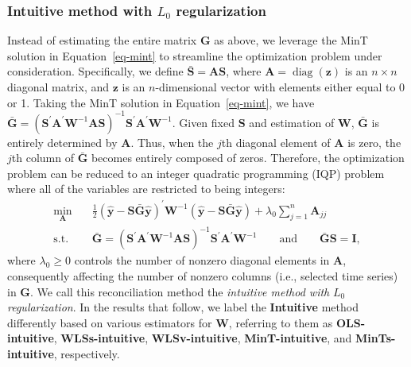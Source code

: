\documentclass[
  11pt]{article}
\begin{document}
\hypertarget{intuitive-method-with-l_0-regularization}{%
\subsubsection*{\texorpdfstring{Intuitive method with \(L_0\)
regularization}{Intuitive method with L\_0 regularization}}\label{intuitive-method-with-l_0-regularization}}

Instead of estimating the entire matrix \(\bm{G}\) as above, we leverage
the MinT solution in Equation~\ref{eq-mint} to streamline the
optimization problem under consideration. Specifically, we define
\(\bar{\bm{S}} = \bm{A}\bm{S}\), where
\(\bm{A} = \operatorname{diag}(\bm{z})\) is an \(n \times n\) diagonal
matrix, and \(\bm{z}\) is an \(n\)-dimensional vector with elements
either equal to 0 or 1. Taking the MinT solution in
Equation~\ref{eq-mint}, we have
\(\bar{\bm{G}} = (\bm{S}^{\prime}\bm{A}^{\prime}\bm{W}^{-1}\bm{A}\bm{S})^{-1}\bm{S}^{\prime}\bm{A}^{\prime}\bm{W}^{-1}\).
Given fixed \(\bm{S}\) and estimation of \(\bm{W}\), \(\bar{\bm{G}}\) is
entirely determined by \(\bm{A}\). Thus, when the \(j\)th diagonal
element of \(\bm{A}\) is zero, the \(j\)th column of \(\bar{\bm{G}}\)
becomes entirely composed of zeros. Therefore, the optimization problem
can be reduced to an integer quadratic programming (IQP) problem where
all of the variables are restricted to being integers: \begin{align*}
\min_{\bm{A}} \quad & \frac{1}{2}\left(\hat{\bm{y}}-\bm{S}\bar{\bm{G}}\hat{\bm{y}}\right)^{\prime} \bm{W}^{-1}\left(\hat{\bm{y}}-\bm{S}\bar{\bm{G}}\hat{\bm{y}}\right) + \lambda_0 \sum_{j=1}^n \bm{A}_{jj} \\
\text{s.t.} \quad & \bar{\bm{G}} = (\bm{S}^{\prime}\bm{A}^{\prime}\bm{W}^{-1}\bm{A}\bm{S})^{-1}\bm{S}^{\prime}\bm{A}^{\prime}\bm{W}^{-1} \qquad\text{and}\qquad \bar{\bm{G}}\bm{S} = \bm{I},
\end{align*} where \(\lambda_0 \geq 0\) controls the number of nonzero
diagonal elements in \(\bm{A}\), consequently affecting the number of
nonzero columns (i.e., selected time series) in \(\bm{G}\). We call this
reconciliation method the \emph{intuitive method with} \(L_0\)
\emph{regularization}. In the results that follow, we label the
\textbf{Intuitive} method differently based on various estimators for
\(\bm{W}\), referring to them as \textbf{OLS-intuitive},
\textbf{WLSs-intuitive}, \textbf{WLSv-intuitive},
\textbf{MinT-intuitive}, and \textbf{MinTs-intuitive}, respectively.
\end{document}
